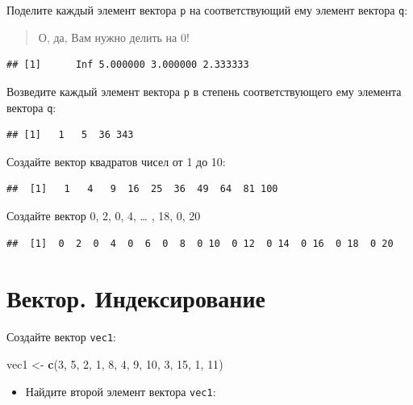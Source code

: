 \documentclass[]{book}
\newenvironment{Shaded}{\begin{snugshade}}{\end{snugshade}}
\newcommand{\DecValTok}[1]{\textcolor[rgb]{0.00,0.00,0.81}{#1}}
\newcommand{\KeywordTok}[1]{\textcolor[rgb]{0.13,0.29,0.53}{\textbf{#1}}}
\newcommand{\NormalTok}[1]{#1}
\newcommand{\StringTok}[1]{\textcolor[rgb]{0.31,0.60,0.02}{#1}}
\providecommand{\tightlist}{%
  \setlength{\itemsep}{0pt}\setlength{\parskip}{0pt}}
\begin{document}
Поделите каждый элемент вектора \texttt{p} на соответствующий ему элемент вектора \texttt{q}:

\begin{quote}
О, да, Вам нужно делить на 0!
\end{quote}

\begin{verbatim}
## [1]      Inf 5.000000 3.000000 2.333333
\end{verbatim}

Возведите каждый элемент вектора \texttt{p} в степень соответствующего ему элемента вектора \texttt{q}:

\begin{verbatim}
## [1]   1   5  36 343
\end{verbatim}

Создайте вектор квадратов чисел от 1 до 10:

\begin{verbatim}
##  [1]   1   4   9  16  25  36  49  64  81 100
\end{verbatim}

Создайте вектор 0, 2, 0, 4, \ldots{} , 18, 0, 20

\begin{verbatim}
##  [1]  0  2  0  4  0  6  0  8  0 10  0 12  0 14  0 16  0 18  0 20
\end{verbatim}

\hypertarget{vec_task_2}{%
\section{Вектор. Индексирование}\label{vec_task_2}}

Создайте вектор \texttt{vec1}:

\begin{Shaded}
\begin{Highlighting}[]
\NormalTok{vec1 <-}\StringTok{ }\KeywordTok{c}\NormalTok{(}\DecValTok{3}\NormalTok{, }\DecValTok{5}\NormalTok{, }\DecValTok{2}\NormalTok{, }\DecValTok{1}\NormalTok{, }\DecValTok{8}\NormalTok{, }\DecValTok{4}\NormalTok{, }\DecValTok{9}\NormalTok{, }\DecValTok{10}\NormalTok{, }\DecValTok{3}\NormalTok{, }\DecValTok{15}\NormalTok{, }\DecValTok{1}\NormalTok{, }\DecValTok{11}\NormalTok{)}
\end{Highlighting}
\end{Shaded}

\begin{itemize}
\tightlist
\item
  Найдите второй элемент вектора \texttt{vec1}:
\end{itemize}
\end{document}
